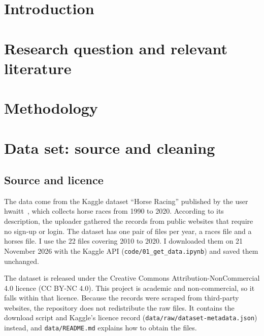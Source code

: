 

\section{Introduction}

\section{Research question and relevant literature}

\section{Methodology}

\section{Data set: source and cleaning}
\subsection{Source and licence}
The data come from the Kaggle dataset ``Horse Racing'' published by the user hwaitt~\cite{hwaitt_horse}, which collects horse races from 1990 to 2020. According to its description, the uploader gathered the records from public websites that require no sign-up or login. The dataset has one pair of files per year, a races file and a horses file. I use the 22 files covering 2010 to 2020. I downloaded them on 21 November 2026 with the Kaggle API (\texttt{code/01\_get\_data.ipynb}) and saved them unchanged.

The dataset is released under the Creative Commons Attribution-NonCommercial 4.0 licence (CC BY-NC 4.0). This project is academic and non-commercial, so it falls within that licence. Because the records were scraped from third-party websites, the repository does not redistribute the raw files. It contains the download script and Kaggle's licence record (\texttt{data/raw/dataset-metadata.json}) instead, and \texttt{data/README.md} explains how to obtain the files.

